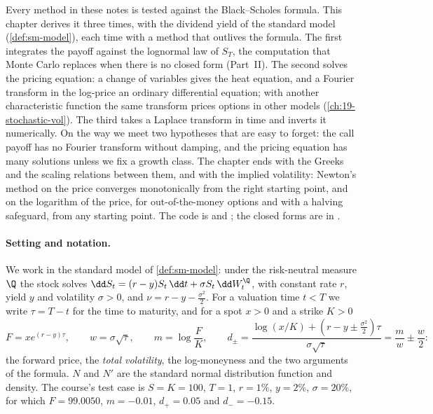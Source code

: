 \providecommand{\C}{\mathbb{C}}

Every method in these notes is tested against the Black--Scholes formula. This chapter derives it three
times, with the dividend yield of the standard model (\cref{def:sm-model}), each time with a method that
outlives the formula. The first integrates the payoff against the lognormal law of $S_T$, the computation
that Monte Carlo replaces when there is no closed form (Part~II). The second solves the pricing equation:
a change of variables gives the heat equation, and a Fourier transform in the log-price an ordinary
differential equation; with another characteristic function the same transform prices options in other
models (\cref{ch:19-stochastic-vol}). The third takes a Laplace transform in time and inverts it
numerically. On the way we meet two hypotheses that are easy to forget: the call payoff has no Fourier
transform without damping, and the pricing equation has many solutions unless we fix a growth class.
The chapter ends with the Greeks and the scaling relations between them, and with the implied
volatility: Newton's method on the price converges monotonically from the right starting point, and on
the logarithm of the price, for out-of-the-money options and with a halving safeguard, from any starting point. The code is 
and ; the closed forms are in .

\paragraph{Setting and notation.} We work in the standard model of \cref{def:sm-model}: under the
risk-neutral measure $\Q$ the stock solves $\dd S_t=(r-y)S_t\,\dd t+\sigma S_t\,\dd W^\Q_t$, with constant
rate $r$, yield $y$ and volatility $\sigma>0$, and $\nu=r-y-\frac{\sigma^2}{2}$. For a valuation time
$t<T$ we write $\tau=T-t$ for the time to maturity, and for a spot $x>0$ and a strike $K>0$
\begin{equation}\label{eq:bsf-dpm}
  F=xe^{(r-y)\tau},\qquad w=\sigma\sqrt\tau,\qquad m=\log\frac FK,\qquad
  d_\pm=\frac{\log(x/K)+(r-y\pm\frac{\sigma^2}{2})\tau}{\sigma\sqrt\tau}=\frac mw\pm\frac w2 :
\end{equation}
the forward price, the \emph{total volatility}, the log-moneyness and the two arguments of the
formula. $N$ and $N'$ are the standard normal distribution function and density. The course's test
case is $S=K=100$, $T=1$, $r=1\%$, $y=2\%$, $\sigma=20\%$, for which $F=99.0050$, $m=-0.01$,
$d_+=0.05$ and $d_-=-0.15$.

